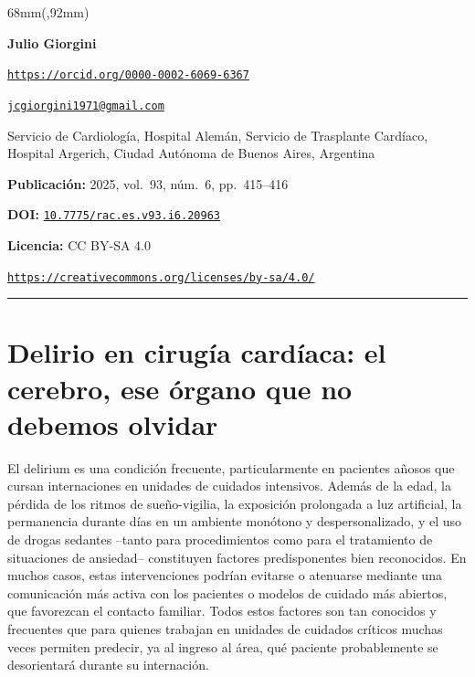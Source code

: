 \begin{textblock*}{68mm}(\gbbloquex,92mm)
{\setlength{\leftskip}{0pt}\setlength{\parindent}{0pt}%
\noindent\begin{minipage}[t]{68mm}
\sffamily\small\setlength{\parskip}{1pt}
{\bfseries\color{azulrevista}Julio Giorgini}\par
{\scriptsize\texttt{\href{https://orcid.org/0000-0002-6069-6367}{https://orcid.org/0000-0002-6069-6367}}}\par
{\scriptsize\texttt{\href{mailto:jcgiorgini1971@gmail.com}{jcgiorgini1971@gmail.com}}}\par
Servicio de Cardiología, Hospital Alemán, Servicio de Trasplante Cardíaco, Hospital Argerich, Ciudad Autónoma de Buenos Aires, Argentina\par
\vspace{6pt}
{\bfseries\color{azulrevista!70}Publicación:} 2025, vol.~93, n\'um.~6, pp.~415--416\par\vspace{6pt}
{\bfseries\color{azulrevista!70}DOI:} {\scriptsize\texttt{\href{https://doi.org/10.7775/rac.es.v93.i6.20963}{10.7775/rac.es.v93.i6.20963}}}\par\vspace{6pt}
{\bfseries\color{azulrevista!70}Licencia:} CC BY-SA 4.0\par
{\scriptsize\texttt{\href{https://creativecommons.org/licenses/by-sa/4.0/}{https://creativecommons.org/licenses/by-sa/4.0/}}}\par
\vspace{6pt}
\end{minipage}%
}%
\end{textblock*}


\bigskip
\noindent\rule{\linewidth}{0.4pt}
\bigskip

\section{Delirio en cirugía cardíaca: el cerebro, ese órgano que no debemos olvidar}
El delirium es una condición frecuente, particularmente en pacientes añosos que cursan internaciones en unidades de cuidados intensivos. Además de la edad, la pérdida de los ritmos de sueño-vigilia, la exposición prolongada a luz artificial, la permanencia durante días en un ambiente monótono y despersonalizado, y el uso de drogas sedantes –tanto para procedimientos como para el tratamiento de situaciones de ansiedad– constituyen factores predisponentes bien reconocidos. En muchos casos, estas intervenciones podrían evitarse o atenuarse mediante una comunicación más activa con los pacientes o modelos de cuidado más abiertos, que favorezcan el contacto familiar. Todos estos factores son tan conocidos y frecuentes que para quienes trabajan en unidades de cuidados críticos muchas veces permiten predecir, ya al ingreso al área, qué paciente probablemente se desorientará durante su internación.

